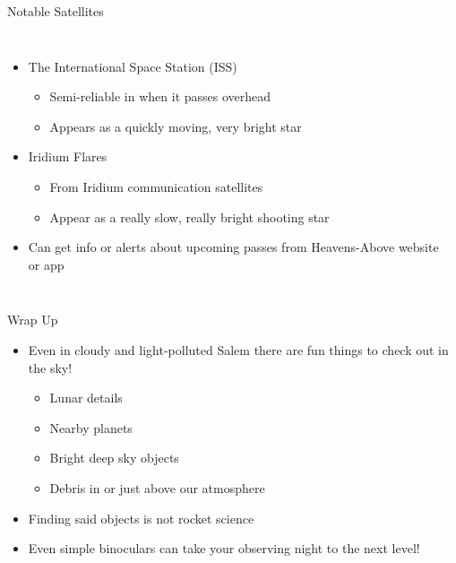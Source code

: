 \documentclass[pdf, ]{beamer}
\begin{document}
\begin{frame}{Notable Satellites}
	\begin{columns}
		\begin{itemize}
			\item The International Space Station (ISS)
				\begin{itemize}
					\item Semi-reliable in when it passes overhead
					\item Appears as a quickly moving, very bright star
				\end{itemize}
			\item Iridium Flares
				\begin{itemize}
					\item From Iridium communication satellites
					\item Appear as a really slow, really bright shooting star
				\end{itemize}
			\item Can get info or alerts about upcoming passes from Heavens-Above website or app
		\end{itemize}
		
		\begin{center}
		\end{center}
	\end{columns}
\end{frame}

\begin{frame}{Wrap Up}
	\begin{itemize}
		\item Even in cloudy and light-polluted Salem there are fun things to check out in the sky!
			\begin{itemize}
				\item Lunar details
				\item Nearby planets
				\item Bright deep sky objects
				\item Debris in or just above our atmosphere
			\end{itemize}
		\item Finding said objects is not rocket science
		\item Even simple binoculars can take your observing night to the next level!
	\end{itemize}
\end{frame}
\end{document}

